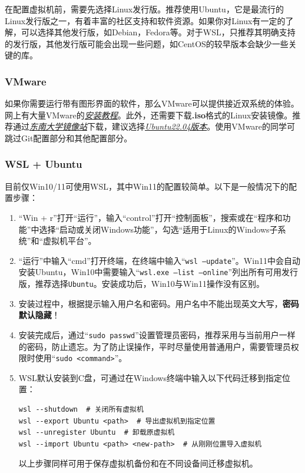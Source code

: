 \documentclass[fontset=ubuntu]{ctexart}
\let\oldhref\href{}
\renewcommand{\href}[2]{\oldhref{#1}{\textit{#2}}}
\begin{document}
在配置虚拟机前，需要先选择Linux发行版。推荐使用Ubuntu，它是最流行的Linux发行版之一，有着丰富的社区支持和软件资源。如果你对Linux有一定的了解，可以选择其他发行版，如Debian，Fedora等。对于WSL，只推荐其明确支持的发行版，其他发行版可能会出现一些问题，如CentOS的较早版本会缺少一些关键的库。

\subsubsection{VMware}

如果你需要运行带有图形界面的软件，那么VMware可以提供接近双系统的体验。网上有大量VMware的\href{https://zhuanlan.zhihu.com/p/617093823}{安装教程}。此外，还需要下载\textbf{.iso}格式的Linux安装镜像。推荐通过\href{https://mirrors.seu.edu.cn/}{东南大学镜像站}下载，建议选择\href{https://mirrors.seu.edu.cn/ubuntu-releases/22.04/ubuntu-22.04.4-desktop-amd64.iso}{Ubuntu22.04版本}。使用VMware的同学可跳过Git配置部分和其他配置部分。

\subsubsection{WSL + Ubuntu}

\noindent 目前仅Win10/11可使用WSL，其中Win11的配置较简单。以下是一般情况下的配置步骤\cite{microsoft2023}：

\begin{enumerate}
    \item “Win + r”打开“运行”，输入“control”打开“控制面板”，搜索或在“程序和功能”中选择“启动或关闭Windows功能”，勾选“适用于Linux的Windows子系统”和“虚拟机平台”。
    \item “运行”中输入“cmd”打开终端，在终端中输入“\texttt{wsl\ --update}”。Win11中会自动安装Ubuntu，Win10中需要输入“\texttt{wsl.exe\ --list\ --online}”列出所有可用发行版，推荐选择\texttt{Ubuntu}。安装成功后，Win10与Win11操作没有区别。
    \item 安装过程中，根据提示输入用户名和密码。用户名中不能出现英文大写，\textbf{密码默认隐藏}！
    \item 安装完成后，通过“\texttt{sudo\ passwd}”设置管理员密码，推荐采用与当前用户一样的密码，防止遗忘。为了防止误操作，平时尽量使用普通用户，需要管理员权限时使用“\texttt{sudo\ \textless{}command\textgreater{}}”。
    \item WSL默认安装到C盘，可通过在Windows终端中输入以下代码迁移到指定位置：
          \begin{lstlisting}
wsl --shutdown  # 关闭所有虚拟机
wsl --export Ubuntu <path>  # 导出虚拟机到指定位置
wsl --unregister Ubuntu  # 卸载原虚拟机
wsl --import Ubuntu <path> <new-path>  # 从刚刚位置导入虚拟机
    \end{lstlisting}

          以上步骤同样可用于保存虚拟机备份和在不同设备间迁移虚拟机。
\end{enumerate}
\end{document}
